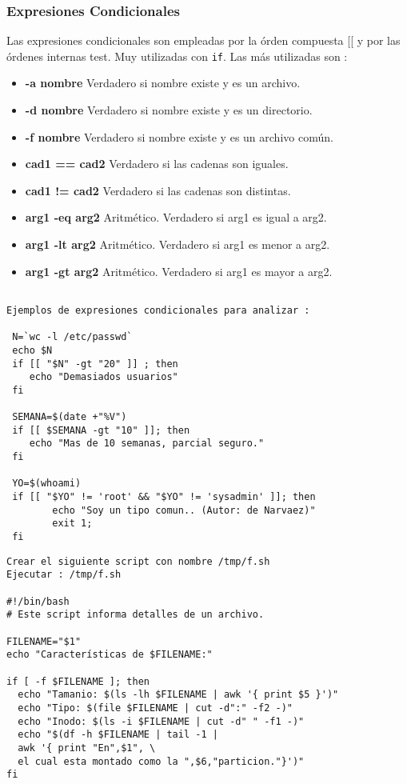 \documentclass{beamer}
\begin{document}
\begin{frame}
\frametitle{Expresiones Condicionales}
Las expresiones condicionales son empleadas por la órden compuesta [[ y por las órdenes internas test. Muy utilizadas con \texttt{if}. Las más utilizadas son :

\begin{itemize}
\item \textbf{-a nombre} Verdadero si nombre existe y es un archivo.
\item \textbf{-d nombre} Verdadero si nombre existe y es un directorio.
\item \textbf{-f nombre} Verdadero si nombre existe y es un archivo común.
\item \textbf{cad1 == cad2 } Verdadero si las cadenas son iguales.
\item \textbf{cad1 != cad2 } Verdadero si las cadenas son distintas.
\item \textbf{arg1 -eq arg2} Aritmético. Verdadero si arg1 es igual a arg2.
\item \textbf{arg1 -lt arg2} Aritmético. Verdadero si arg1 es menor a arg2.
\item \textbf{arg1 -gt arg2} Aritmético. Verdadero si arg1 es mayor a arg2.

\end{itemize}
\end{frame}

\begin{Verbatim}

Ejemplos de expresiones condicionales para analizar :

 N=`wc -l /etc/passwd`
 echo $N
 if [[ "$N" -gt "20" ]] ; then 
	echo "Demasiados usuarios"
 fi

 SEMANA=$(date +"%V")
 if [[ $SEMANA -gt "10" ]]; then
	echo "Mas de 10 semanas, parcial seguro."
 fi

 YO=$(whoami)
 if [[ "$YO" != 'root' && "$YO" != 'sysadmin' ]]; then
        echo "Soy un tipo comun.. (Autor: de Narvaez)"
        exit 1;
 fi

\end{Verbatim}


\begin{Verbatim}
Crear el siguiente script con nombre /tmp/f.sh
Ejecutar : /tmp/f.sh

#!/bin/bash
# Este script informa detalles de un archivo.

FILENAME="$1"
echo "Características de $FILENAME:"

if [ -f $FILENAME ]; then
  echo "Tamanio: $(ls -lh $FILENAME | awk '{ print $5 }')"
  echo "Tipo: $(file $FILENAME | cut -d":" -f2 -)"
  echo "Inodo: $(ls -i $FILENAME | cut -d" " -f1 -)"
  echo "$(df -h $FILENAME | tail -1 | 
  awk '{ print "En",$1", \
  el cual esta montado como la ",$6,"particion."}')"
fi
\end{Verbatim}
\end{document}
